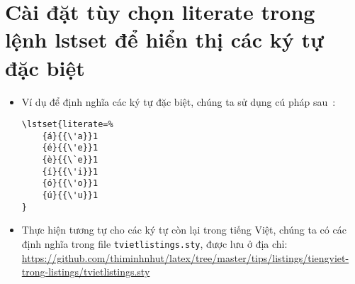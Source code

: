 \documentclass[12pt,a4paper]{article}
\begin{document}
\section{Cài đặt tùy chọn literate trong lệnh lstset để hiển thị các ký tự đặc biệt}
\begin{itemize}
  \item Ví dụ để định nghĩa các ký tự đặc biệt, chúng ta sử dụng cú pháp sau~\cite{listings-stackexchange}:
        \begin{lstlisting}
\lstset{literate=%
    {á}{{\'a}}1
    {é}{{\'e}}1
    {è}{{\`e}}1
    {í}{{\'i}}1
    {ó}{{\'o}}1
    {ú}{{\'u}}1
}
\end{lstlisting}

  \item Thực hiện tương tự cho các ký tự còn lại trong tiếng Việt, chúng ta có các định nghĩa trong file \verb|tvietlistings.sty|, được lưu ở địa chỉ: \url{https://github.com/thiminhnhut/latex/tree/master/tips/listings/tiengviet-trong-listings/tvietlistings.sty}
\end{itemize}
\end{document}
